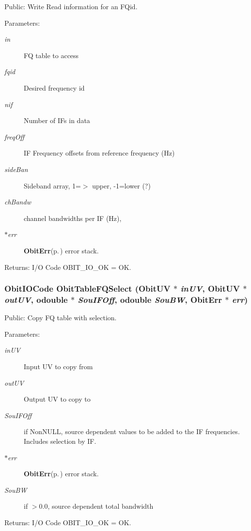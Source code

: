 Public: Write Read information for an FQid. 

\begin{Desc}
\item[Parameters:]
\begin{description}
\item[{\em in}]FQ table to access \item[{\em fqid}]Desired frequency id \item[{\em nif}]Number of IFs in data \item[{\em freq\-Off}]IF Frequency offsets from reference frequency (Hz) \item[{\em side\-Ban}]Sideband array, 1=$>$ upper, -1=lower (?) \item[{\em ch\-Bandw}]channel bandwidths per IF (Hz), \item[{\em $\ast$err}]{\bf Obit\-Err}{\rm (p.\,\pageref{structObitErr})} error stack. \end{description}
\end{Desc}
\begin{Desc}
\item[Returns:]I/O Code OBIT\_\-IO\_\-OK = OK. \end{Desc}
\subsubsection{\setlength{\rightskip}{0pt plus 5cm}Obit\-IOCode Obit\-Table\-FQSelect ({\bf Obit\-UV} $\ast$ {\em in\-UV}, {\bf Obit\-UV} $\ast$ {\em out\-UV}, {\bf odouble} $\ast$ {\em Sou\-IFOff}, {\bf odouble} {\em Sou\-BW}, {\bf Obit\-Err} $\ast$ {\em err})}\label{ObitTableFQUtil_8c_a2}


Public: Copy FQ table with selection. 

\begin{Desc}
\item[Parameters:]
\begin{description}
\item[{\em in\-UV}]Input UV to copy from \item[{\em out\-UV}]Output UV to copy to \item[{\em Sou\-IFOff}]if Non\-NULL, source dependent values to be added to the IF frequencies. Includes selection by IF. \item[{\em $\ast$err}]{\bf Obit\-Err}{\rm (p.\,\pageref{structObitErr})} error stack. \item[{\em Sou\-BW}]if $>$0.0, source dependent total bandwidth \end{description}
\end{Desc}
\begin{Desc}
\item[Returns:]I/O Code OBIT\_\-IO\_\-OK = OK. \end{Desc}
